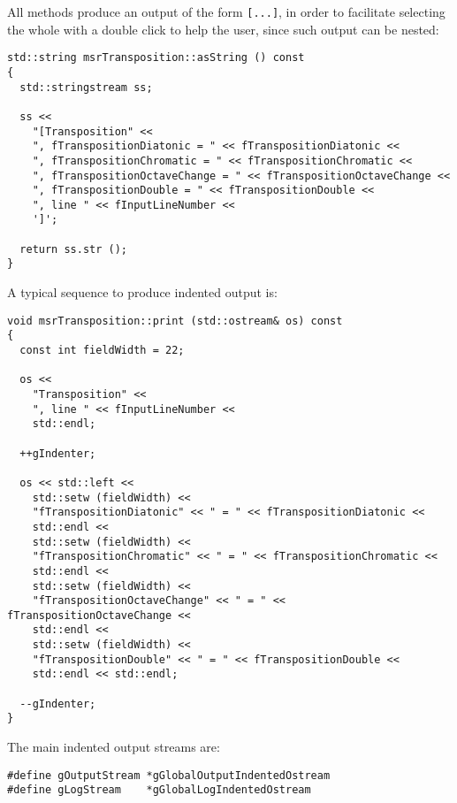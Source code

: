 All  methods produce an output of the form {\tt [...]}, in order to facilitate selecting the whole with a double click to help the user, since such output can be nested:
\begin{lstlisting}[language=CPlusPlus]
std::string msrTransposition::asString () const
{
  std::stringstream ss;

  ss <<
    "[Transposition" <<
    ", fTranspositionDiatonic = " << fTranspositionDiatonic <<
    ", fTranspositionChromatic = " << fTranspositionChromatic <<
    ", fTranspositionOctaveChange = " << fTranspositionOctaveChange <<
    ", fTranspositionDouble = " << fTranspositionDouble <<
    ", line " << fInputLineNumber <<
    ']';

  return ss.str ();
}
\end{lstlisting}

A typical sequence to produce indented output is:
\begin{lstlisting}[language=CPlusPlus]
void msrTransposition::print (std::ostream& os) const
{
  const int fieldWidth = 22;

  os <<
    "Transposition" <<
    ", line " << fInputLineNumber <<
    std::endl;

  ++gIndenter;

  os << std::left <<
    std::setw (fieldWidth) <<
    "fTranspositionDiatonic" << " = " << fTranspositionDiatonic <<
    std::endl <<
    std::setw (fieldWidth) <<
    "fTranspositionChromatic" << " = " << fTranspositionChromatic <<
    std::endl <<
    std::setw (fieldWidth) <<
    "fTranspositionOctaveChange" << " = " << fTranspositionOctaveChange <<
    std::endl <<
    std::setw (fieldWidth) <<
    "fTranspositionDouble" << " = " << fTranspositionDouble <<
    std::endl << std::endl;

  --gIndenter;
}
\end{lstlisting}

The main indented output streams are:
\begin{lstlisting}[language=CPlusPlus]
#define gOutputStream *gGlobalOutputIndentedOstream
#define gLogStream    *gGlobalLogIndentedOstream

\end{lstlisting}


